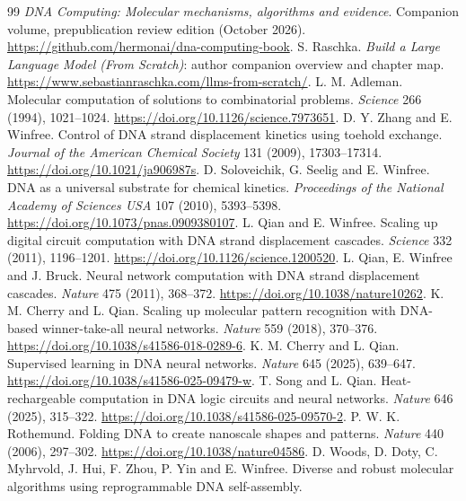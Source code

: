 \begin{thebibliography}{99}
 \emph{DNA Computing: Molecular mechanisms, algorithms and
evidence}. Companion volume, prepublication review edition (October 2026).
\url{https://github.com/hermonai/dna-computing-book}.
 S. Raschka. \emph{Build a Large Language Model (From Scratch)}:
author companion overview and chapter map.
\url{https://www.sebastianraschka.com/llms-from-scratch/}.
 L. M. Adleman. Molecular computation of solutions to combinatorial
problems. \emph{Science} 266 (1994), 1021--1024.
\url{https://doi.org/10.1126/science.7973651}.
 D. Y. Zhang and E. Winfree. Control of DNA strand displacement
kinetics using toehold exchange. \emph{Journal of the American Chemical Society} 131 (2009),
17303--17314. \url{https://doi.org/10.1021/ja906987s}.
 D. Soloveichik, G. Seelig and E. Winfree. DNA as a universal
substrate for chemical kinetics. \emph{Proceedings of the National Academy of Sciences USA}
107 (2010), 5393--5398. \url{https://doi.org/10.1073/pnas.0909380107}.
 L. Qian and E. Winfree. Scaling up digital circuit computation
with DNA strand displacement cascades. \emph{Science} 332 (2011), 1196--1201.
\url{https://doi.org/10.1126/science.1200520}.
 L. Qian, E. Winfree and J. Bruck. Neural network computation
with DNA strand displacement cascades. \emph{Nature} 475 (2011), 368--372.
\url{https://doi.org/10.1038/nature10262}.
 K. M. Cherry and L. Qian. Scaling up molecular pattern recognition
with DNA-based winner-take-all neural networks. \emph{Nature} 559 (2018), 370--376.
\url{https://doi.org/10.1038/s41586-018-0289-6}.
 K. M. Cherry and L. Qian. Supervised learning in DNA neural
networks. \emph{Nature} 645 (2025), 639--647.
\url{https://doi.org/10.1038/s41586-025-09479-w}.
 T. Song and L. Qian. Heat-rechargeable computation in DNA logic
circuits and neural networks. \emph{Nature} 646 (2025), 315--322.
\url{https://doi.org/10.1038/s41586-025-09570-2}.
 P. W. K. Rothemund. Folding DNA to create nanoscale shapes and
patterns. \emph{Nature} 440 (2006), 297--302.
\url{https://doi.org/10.1038/nature04586}.
 D. Woods, D. Doty, C. Myhrvold, J. Hui, F. Zhou, P. Yin and E. Winfree.
Diverse and robust molecular algorithms using reprogrammable DNA self-assembly.

\end{thebibliography}
